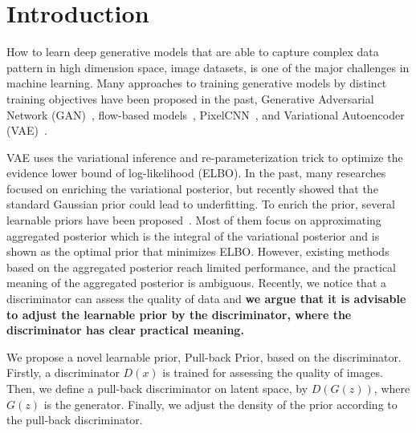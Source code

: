 \section{Introduction}

How to learn deep generative models that are able to capture complex data pattern in high dimension space, \EG image datasets, is one of the major challenges in machine learning. Many approaches to training generative models by distinct training objectives have been proposed in the past, \EG Generative Adversarial Network (GAN)~\cite{goodfellow2014generative}, flow-based models~\cite{dinh2016density,kingma2018glow}, PixelCNN~\cite{van2016conditional}, and Variational Autoencoder (VAE)~\cite{kingma2014auto,rezende_stochastic_2014}.

VAE uses the variational inference and re-parameterization trick to optimize the evidence lower bound of log-likelihood (ELBO). In the past, many researches~\cite{kingma2016improved,tomczak2016improving} focused on enriching the variational posterior, but recently \cite{tomczak2018vae} showed that the standard Gaussian prior could lead to underfitting. To enrich the prior, several learnable priors have been proposed~\cite{tomczak2018vae,bauer2019resampled,takahashi2019variational}. Most of them focus on approximating aggregated posterior which is the integral of the variational posterior and is shown as the optimal prior that minimizes ELBO. However, existing methods based on the aggregated posterior reach limited performance, and the practical meaning of the aggregated posterior is ambiguous. Recently, we notice that a discriminator can assess the quality of data and \textbf{we argue that it is advisable to adjust the learnable prior by the discriminator, where the discriminator has clear practical meaning. } 

We propose a novel learnable prior, Pull-back Prior, based on the discriminator.
Firstly, a discriminator $D(x)$ is trained for assessing the quality of images. Then, we define a pull-back discriminator on latent space, by $D(G(z))$, where $G(z)$ is the generator. Finally, we adjust the density of the prior according to the pull-back discriminator. 

